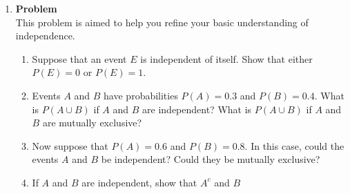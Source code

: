 \documentclass[12pt]{article}
\newenvironment{Ex}{\textbf{Problem}\vspace{.75em}\\}{}
\begin{document}
\begin{enumerate}
\begin{Ex}
\begin{solution}
\begin{enumerate}
          \begin{equation}
            \label{eq:6a-mat}
            \begin{pmatrix}
              7 \\ 3
            \end{pmatrix} &= \frac{7!}{3!4!}
            &= 35
          \end{equation}
          There are $15$ combinations involving a particular
          electrical engineer, so the probablility that one particular
          electrical engineer must be on the committee is
          $\frac{3}{7}$.
        \item The total number of possible combinations for all
          mechanical engineers in the group can be written as
          \begin{equation}
            \label{eq:6b-mat}
            \begin{pmatrix}
              5 \\ 3
            \end{pmatrix} &= \frac{5!}{3!4!}
            &= 10
          \end{equation}
          There are 3 combinations involving two particular mechanical
          engineers on the committee, so the probability that two
          particular mechanical engineers are not together on the
          committee is $\frac{7}{10}$. The probability that two
          particular mechanical engineers are together is
          $\frac{3}{10}$.
        \end{enumerate}
      \end{solution}
    \end{Ex}
  \item
    \begin{Ex}
      This problem is aimed to help you refine your basic
      understanding of independence.
      \begin{enumerate}
      \item Suppose that an event $E$ is independent of itself. Show
        that either $P(E) = 0$ or $P(E) = 1$.
      \item Events $A$ and $B$ have probabilities $P(A)=0.3$ and
        $P(B)=0.4$. What is $P(A \cup B)$ if $A$ and $B$ are
        independent? What is $P(A \cup B)$ if $A$ and $B$ are
        mutually exclusive?
      \item Now suppose that $P(A) = 0.6$ and $P(B) = 0.8$. In this
        case, could the events $A$ and $B$ be independent? Could they
        be mutually exclusive?
      \item If $A$ and $B$ are independent, show that $A^c$ and $B$

\end{enumerate}
\end{Ex}
\end{enumerate}
\end{document}
